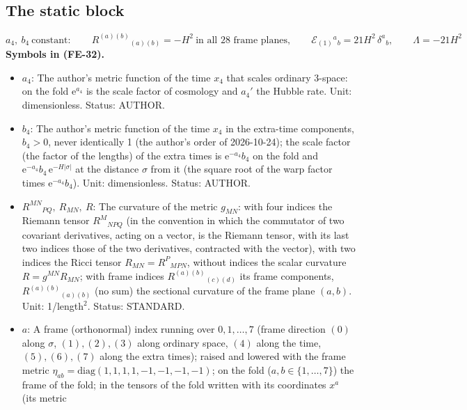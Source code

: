 \documentclass[
  10pt,
]{article}
\providecommand{\tightlist}{%
  \setlength{\itemsep}{0pt}\setlength{\parskip}{0pt}}
\begin{document}
\hypertarget{the-static-block}{%
\subsection{The static block}\label{the-static-block}}

\[
a_4,\ b_4\ \text{constant}:\qquad R^{(a)(b)}{}_{(a)(b)} = -H^2\ \text{in all 28 frame planes},\qquad
\mathcal{E}_{(1)}{}^a{}_b = 21H^2\,\delta^a{}_b,\qquad \Lambda = -21H^2 \tag{FE-32}
\] \textbf{Symbols in (FE-32).}

\begin{itemize}
\tightlist
\item
  \(a_4\): The author's metric function of the time \(x_4\) that scales
  ordinary 3-space: on the fold \(\mathrm{e}^{a_4}\) is the scale factor
  of cosmology and \(a_4'\) the Hubble rate. Unit: dimensionless.
  Status: AUTHOR.
\item
  \(b_4\): The author's metric function of the time \(x_4\) in the
  extra-time components, \(b_4 > 0\), never identically 1 (the author's
  order of 2026-10-24); the scale factor (the factor of the lengths) of
  the extra times is \(\mathrm{e}^{-a_4}b_4\) on the fold and
  \(\mathrm{e}^{-a_4}b_4\,\mathrm{e}^{-H\lvert\sigma\rvert}\) at the
  distance \(\sigma\) from it (the square root of the warp factor times
  \(\mathrm{e}^{-a_4}b_4\)). Unit: dimensionless. Status: AUTHOR.
\item
  \(R^{MN}{}_{PQ},\ R_{MN},\ R\): The curvature of the metric
  \(g_{MN}\): with four indices the Riemann tensor \(R^M{}_{NPQ}\) (in
  the convention in which the commutator of two covariant derivatives,
  acting on a vector, is the Riemann tensor, with its last two indices
  those of the two derivatives, contracted with the vector), with two
  indices the Ricci tensor \(R_{MN} = R^P{}_{MPN}\), without indices the
  scalar curvature \(R = g^{MN}R_{MN}\); with frame indices
  \(R^{(a)(b)}{}_{(c)(d)}\) its frame components,
  \(R^{(a)(b)}{}_{(a)(b)}\) (no sum) the sectional curvature of the
  frame plane \((a, b)\). Unit: 1/length\(^2\). Status: STANDARD.
\item
  \(a\): A frame (orthonormal) index running over \(0, 1, \dots, 7\)
  (frame direction \((0)\) along \(\sigma\), \((1), (2), (3)\) along
  ordinary space, \((4)\) along the time, \((5), (6), (7)\) along the
  extra times); raised and lowered with the frame metric
  \(\eta_{ab} = \mathrm{diag}(1, 1, 1, 1, -1, -1, -1, -1)\); on the fold
  (\(a, b \in \{1, \dots, 7\}\)) the frame of the fold; in the tensors
  of the fold written with its coordinates \(x^a\) (its metric

\end{itemize}
\end{document}
